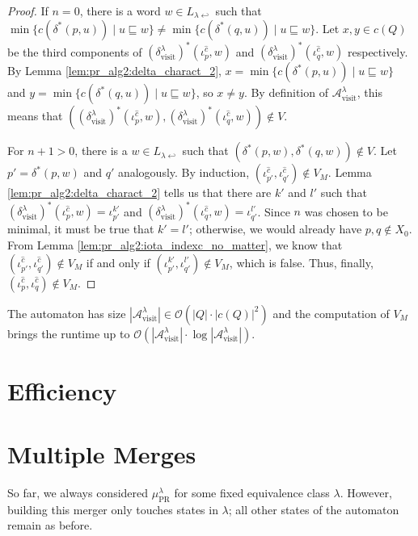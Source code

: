 \begin{proof}
	If $n = 0$, there is a word $w \in L_{\lambda \hookleftarrow}$ such that $\min \{c(\delta^*(p, u)) \mid u \sqsubseteq w\} \neq \min \{c(\delta^*(q, u)) \mid u \sqsubseteq w\}$. Let $x, y \in c(Q)$ be the third components of $(\delta^\lambda_\text{visit})^*(\iota_p^{\hat{c}}, w)$ and $(\delta^\lambda_\text{visit})^*(\iota_q^{\hat{c}}, w)$ respectively. By Lemma \ref{lem:pr_alg2:delta_charact_2}, $x = \min \{c(\delta^*(p, u)) \mid u \sqsubseteq w\}$ and $y = \min \{c(\delta^*(q, u)) \mid u \sqsubseteq w\}$, so $x \neq y$. By definition of $\mathcal{A}^\lambda_\text{visit}$, this means that $((\delta^\lambda_\text{visit})^*(\iota_p^{\hat{c}}, w), (\delta^\lambda_\text{visit})^*(\iota_q^{\hat{c}}, w)) \notin V$.
	
	For $n+1 > 0$, there is a $w \in L_{\lambda \hookleftarrow}$ such that $(\delta^*(p, w), \delta^*(q, w)) \notin V$. Let $p' = \delta^*(p, w)$ and $q'$ analogously. By induction, $(\iota_{p'}^{\hat{c}}, \iota_{q'}^{\hat{c}}) \notin V_M$. Lemma \ref{lem:pr_alg2:delta_charact_2} tells us that there are $k'$ and $l'$ such that $(\delta^\lambda_\text{visit})^*(\iota_p^{\hat{c}}, w) = \iota_{p'}^{k'}$ and $(\delta^\lambda_\text{visit})^*(\iota_q^{\hat{c}}, w) = \iota_{q'}^{l'}$. Since $n$ was chosen to be minimal, it must be true that $k' = l'$; otherwise, we would already have $p, q \notin X_0$. From Lemma \ref{lem:pr_alg2:iota_indexc_no_matter}, we know that $(\iota_{p'}^{\hat{c}}, \iota_{q'}^{\hat{c}}) \notin V_M$ if and only if $(\iota_{p'}^{k'}, \iota_{q'}^{l'}) \notin V_M$, which is false. Thus, finally, $(\iota_p^{\hat{c}}, \iota_q^{\hat{c}}) \notin V_M$.
\end{proof}

The automaton has size $|\mathcal{A}^\lambda_\text{visit}| \in \mathcal{O}(|Q| \cdot |c(Q)|^2)$ and the computation of $V_M$ brings the runtime up to $\mathcal{O}(|\mathcal{A}^\lambda_\text{visit}| \cdot \log |\mathcal{A}^\lambda_\text{visit}|)$.



\section{Efficiency}


\section{Multiple Merges}
So far, we always considered $\mu_\text{PR}^\lambda$ for some fixed equivalence class $\lambda$. However, building this merger only touches states in $\lambda$; all other states of the automaton remain as before. 

